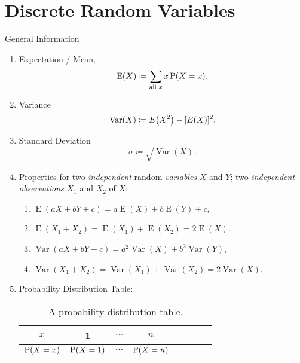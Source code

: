 \documentclass[oneside]{book}
\begin{document}
\chapter{Discrete Random Variables}
\begin{stbox}{General Information}
  \begin{enumerate}
    \item Expectation / Mean, 
    \[\operatorname{E}(X)\coloneq \sum_{\text{all } x}{x\operatorname{P}(X=x)}.\]
    \item Variance 
    \[\operatorname{Var}(X)\coloneq E\hspace{-0.7mm}\left(X^2\right)-[E(X)]^2.\]
    \item Standard Deviation
    \[\sigma\coloneq \sqrt{\operatorname{Var}(X)}.\]
    \item Properties for two \emph{independent} random \emph{variables} \(X\) and \(Y\); two \emph{independent observations} \(X_1\) and \(X_2\) of \(X\):
    \begin{enumerate}
      \item \(\operatorname{E}(aX+bY+c)=a\operatorname{E}(X)+b\operatorname{E}(Y)+c\),
      \item \(\operatorname{E}(X_1+X_2)=\operatorname{E}(X_1)+\operatorname{E}(X_2)=2\operatorname{E}(X)\).
      \item \(\operatorname{Var}(aX+bY+c)=a^2\operatorname{Var}(X)+b^2\operatorname{Var}(Y)\),
      \item \(\operatorname{Var}(X_1+X_2)=\operatorname{Var}(X_1)+\operatorname{Var}(X_2)=2\operatorname{Var}(X)\).
    \end{enumerate}
    \item Probability Distribution Table:
    \begin{table}[H]
      \centering
      \begin{tabular}{|Sc|Sc|Sc|Sc|}
        \hline
        \(x\) & 1 & \(\cdots\) & \(n\)\\
        \hline
        \(\operatorname{P}(X=x)\) & \(\operatorname{P}(X=1)\) & \(\cdots\) & \(\operatorname{P}(X=n)\)\\
        \hline
      \end{tabular}
      \caption{A probability distribution table.}
      \label{table:a-probability-distribution-table}
    \end{table}
  \end{enumerate}
\end{stbox}
\end{document}
